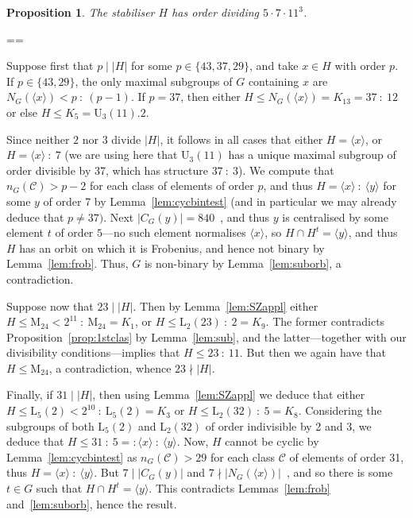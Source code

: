 \documentclass[11pt, a4paper]{amsart}
\makeatletter
\def\cn{\mathord{{\!\:{:}\:\!}}}
\newtheorem{prop}[thm]{Proposition}
\renewcommand{\proofname}{Proof}
\renewenvironment{proof}[1][\proofname]{\par
  \pushQED{\qed}  \normalfont \partopsep=\z@skip \topsep=\z@skip
  \trivlist
  \item[\hskip\labelsep
        \scshape
    #1\@addpunct{.}]\ignorespaces
}{  \popQED\endtrivlist\@endpefalse
}
\makeatother
\begin{document}
\begin{prop}\label{prop:J4bigorderreduction}
The stabiliser $H$ has order dividing $5\cdot7\cdot 11^3$.
\end{prop}
\begin{proof}
    Suppose first that $p\mid |H|$ for some $p\in\{43,37,29\}$, and take $x\in H$ with order $p$. If $p\in\{43,29\}$, the only maximal subgroups of $G$ containing $x$ are $N_G(\langle x\rangle)<p\cn(p-1)$.  If $p=37$, then either $H\leq N_G(\langle x\rangle)=K_{13}=37\cn12$ or else $H\leq K_5= \mathrm{U}_3(11).2$.
    
    Since neither $2$ nor $3$ divide $|H|$, it follows in all cases that either $H=\langle x\rangle$, or $H=\langle x\rangle\cn 7$ (we are using here that $\mathrm{U}_3(11)$ has a unique maximal subgroup of order divisible by 37, which has structure $37\cn 3$). We compute that $n_G(\mathcal{C})>p-2$ for each class of elements of order $p$, and thus $H=\langle x\rangle\cn \langle y\rangle$ for some $y$ of order 7 by Lemma~\ref{lem:cycbintest} (and in particular we may already deduce that $p\ne37)$. Next $|C_G(y)|=840$~\cite{atlas}, and thus $y$ is centralised by some element $t$ of order $5$---no such element normalises $\langle x\rangle$, so $H\cap H^t=\langle y\rangle$, and thus $H$ has an orbit on which it is Frobenius, and hence not binary by Lemma~\ref{lem:frob}. Thus, $G$ is non-binary by Lemma~\ref{lem:suborb}, a contradiction.

    Suppose now that $23\mid |H|$. Then by Lemma~\ref{lem:SZappl} either $H\leq \mathrm{M}_{24}<2^{11}\cn\mathrm{M}_{24}=K_1$, or $H\leq \mathrm{L}_2(23)\cn2=K_9$. The former contradicts Proposition~\ref{prop:1stclas} by Lemma~\ref{lem:sub}, and the latter---together with our divisibility conditions---implies that $H\leq23\cn11$. But then we again have that $H\leq \mathrm{M}_{24}$, a contradiction, whence $23\nmid |H|.$

    Finally, if $31\mid |H|$, then using Lemma~\ref{lem:SZappl} we deduce that either $H\leq \mathrm{L}_{5}(2)<2^{10}\cn\mathrm{L}_5(2)=K_3$ or $H\leq\mathrm{L}_{2}(32)\cn5=K_8$. Considering the subgroups of both $\mathrm{L}_5(2)$ and $\mathrm{L}_{2}(32)$ of order indivisible by 2 and 3, we deduce that $H\leq 31\cn5=:\langle x\rangle\cn\langle y\rangle$. Now, $H$ cannot be cyclic by Lemma~\ref{lem:cycbintest} as $n_G(\mathcal{C})>29$ for each class $\mathcal{C}$ of elements of order 31, thus $H=\langle x\rangle\cn\langle y\rangle$. But $7\mid|C_G(y)|$ and $7\nmid |N_G(\langle x\rangle)|$~\cite{atlas}, and so there is some $t\in G$ such that $H\cap H^t=\langle y\rangle$. This contradicts Lemmas~\ref{lem:frob} and~\ref{lem:suborb}, hence the result.
\end{proof}
\end{document}
